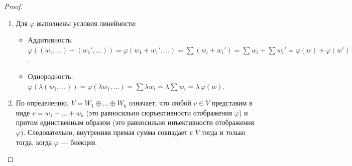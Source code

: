 \begin{proof}
	\begin{enumerate}
		\item Для $\varphi$ выполнены условия линейности:
		\begin{itemize}
			\item Аддитивность: $\varphi((w_1, \ldots) + (w_1', \ldots)) = \varphi(w_1 + w_1', \ldots) = \sum (w_i + w_i') = \sum w_i + \sum w_i' = \varphi(w) + \varphi(w')$.
			\item Однородность: $\varphi(\lambda(w_1, \dots)) = \varphi(\lambda w_1, \dots) = \sum \lambda w_i = \lambda \sum w_i = \lambda\,\varphi(w)$.
		\end{itemize}
		\item По определению, $V = W_1 \oplus \dots \oplus W_k$ означает, что любой $v \in V$ представим в виде $v = w_1 + \dots + w_k$ (это равносильно сюръективности отображения $\varphi$) и притом единственным образом (это равносильно инъективности отображения $\varphi$). Следовательно, внутренняя прямая сумма совпадает с $V$ тогда и только тогда, когда $\varphi$ --- биекция.
	\end{enumerate}
\end{proof}
